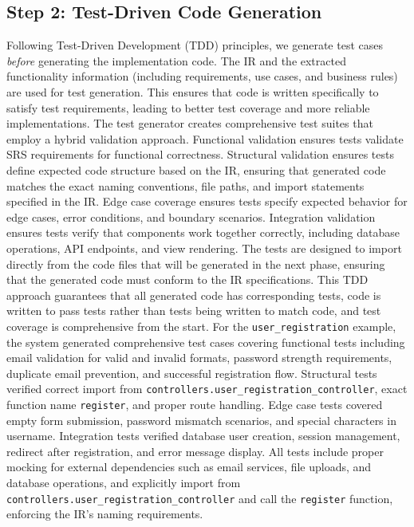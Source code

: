 \subsection{Step 2: Test-Driven Code Generation}

Following Test-Driven Development (TDD) principles, we generate test cases \textit{before} generating the implementation code. The IR and the extracted functionality information (including requirements, use cases, and business rules) are used for test generation. This ensures that code is written specifically to satisfy test requirements, leading to better test coverage and more reliable implementations. The test generator creates comprehensive test suites that employ a hybrid validation approach. Functional validation ensures tests validate SRS requirements for functional correctness. Structural validation ensures tests define expected code structure based on the IR, ensuring that generated code matches the exact naming conventions, file paths, and import statements specified in the IR. Edge case coverage ensures tests specify expected behavior for edge cases, error conditions, and boundary scenarios. Integration validation ensures tests verify that components work together correctly, including database operations, API endpoints, and view rendering. The tests are designed to import directly from the code files that will be generated in the next phase, ensuring that the generated code must conform to the IR specifications. This TDD approach guarantees that all generated code has corresponding tests, code is written to pass tests rather than tests being written to match code, and test coverage is comprehensive from the start. For the \texttt{user\_registration} example, the system generated comprehensive test cases covering functional tests including email validation for valid and invalid formats, password strength requirements, duplicate email prevention, and successful registration flow. Structural tests verified correct import from \texttt{controllers.user\_registration\_controller}, exact function name \texttt{register}, and proper route handling. Edge case tests covered empty form submission, password mismatch scenarios, and special characters in username. Integration tests verified database user creation, session management, redirect after registration, and error message display. All tests include proper mocking for external dependencies such as email services, file uploads, and database operations, and explicitly import from \texttt{controllers.user\_registration\_controller} and call the \texttt{register} function, enforcing the IR's naming requirements.

